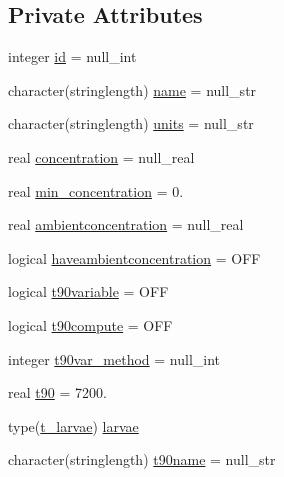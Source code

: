 \subsection*{Private Attributes}
\begin{DoxyCompactItemize}
\item 
integer \mbox{\hyperlink{structmodulelagrangianglobal_1_1t__property_a9e13baa4ae83bc79d7c32fee415a864e}{id}} = null\+\_\+int
\item 
character(stringlength) \mbox{\hyperlink{structmodulelagrangianglobal_1_1t__property_af543afa2b352fba8983705b06f68da8d}{name}} = null\+\_\+str
\item 
character(stringlength) \mbox{\hyperlink{structmodulelagrangianglobal_1_1t__property_a9e13518a9575cb598184a64a8a0f0ed9}{units}} = null\+\_\+str
\item 
real \mbox{\hyperlink{structmodulelagrangianglobal_1_1t__property_a3d87d40e09c56e2d0b8881108c5ae896}{concentration}} = null\+\_\+real
\item 
real \mbox{\hyperlink{structmodulelagrangianglobal_1_1t__property_a46c15230ae23f9e0de64748cd7887573}{min\+\_\+concentration}} = 0.
\item 
real \mbox{\hyperlink{structmodulelagrangianglobal_1_1t__property_a2810047789954151510b4a22f91082f6}{ambientconcentration}} = null\+\_\+real
\item 
logical \mbox{\hyperlink{structmodulelagrangianglobal_1_1t__property_ae0ca104595a82e8f9955f6b9614e0d56}{haveambientconcentration}} = O\+FF
\item 
logical \mbox{\hyperlink{structmodulelagrangianglobal_1_1t__property_a2f0925e257e9a24ca18739db4159da13}{t90variable}} = O\+FF
\item 
logical \mbox{\hyperlink{structmodulelagrangianglobal_1_1t__property_a50fe741225ce5d7e72ac7526df830a0f}{t90compute}} = O\+FF
\item 
integer \mbox{\hyperlink{structmodulelagrangianglobal_1_1t__property_af49fafb3bb0bacfa20a72390441b6d59}{t90var\+\_\+method}} = null\+\_\+int
\item 
real \mbox{\hyperlink{structmodulelagrangianglobal_1_1t__property_a1c092821c10c195b85fd0404898abe3c}{t90}} = 7200.
\item 
type(\mbox{\hyperlink{structmodulelagrangianglobal_1_1t__larvae}{t\+\_\+larvae}}) \mbox{\hyperlink{structmodulelagrangianglobal_1_1t__property_aa2c05196b643db6fcb59e841539ebb9e}{larvae}}
\item 
character(stringlength) \mbox{\hyperlink{structmodulelagrangianglobal_1_1t__property_ab0cbe1b6e7fef6c13460286bcad1d0c9}{t90name}} = null\+\_\+str

\end{DoxyCompactItemize}
